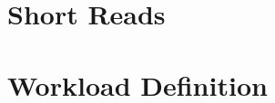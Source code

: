 \section{Short Reads}
\label{sec:interactive-short-reads}







\section{Workload Definition}
\label{sec:interactive-workload-definition}


